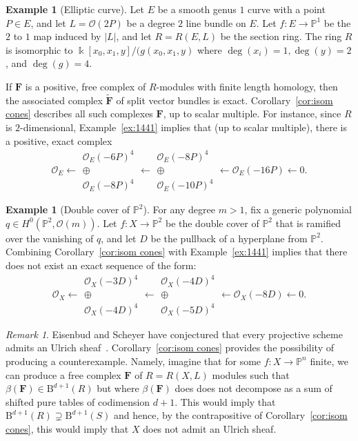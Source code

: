 \documentclass[12pt]{amsart}
\theoremstyle{definition}
\newtheorem{example}[lemma]{Example}
\theoremstyle{remark}
\newtheorem{remark}[lemma]{Remark}
\newcommand{\kk}{\Bbbk}
\newcommand{\PP}{\mathbb{P}}
\newcommand{\cO}{\mathcal{O}}
\newcommand{\FF}{\mathbf{F}}
\newcommand{\BBQ}{\mathrm{B}}
\begin{document}
\begin{example}[Elliptic curve]
Let $E$ be a smooth genus $1$ curve with a point $P\in E$, and let $L=\cO(2P)$ be a degree $2$ line bundle on $E$.  Let $f\colon E\to \PP^1$ be the $2$ to $1$ map induced by $|L|$, and let $R=R(E,L)$ be the section ring.  The ring $R$ is isomorphic to $\kk[x_0,x_1,y]/(g(x_0,x_1,y)$ where $\deg(x_i)=1,\deg(y)=2$, and $\deg(g)=4$.

If $\FF$ is a positive, free complex of $R$-modules with finite length homology, then the associated complex $\widetilde{\FF}$ of split vector bundles is exact.  Corollary~\ref{cor:isom cones} describes all such complexes $\FF$, up to scalar multiple.
For instance, since $R$ is $2$-dimensional, Example~\ref{ex:1441} implies that (up to scalar multiple), there is a positive, exact complex
\[
\cO_E\longleftarrow \begin{matrix}  \cO_E(-6P)^4\\ \oplus\\ \cO_E(-8P)^4\end{matrix}\longleftarrow \begin{matrix}  \cO_E(-8P)^4\\ \oplus\\ \cO_E(-10P)^4\end{matrix} \longleftarrow \cO_E(-16P)\longleftarrow 0.
\]
\end{example}



\begin{example}[Double cover of $\PP^2$]
For any degree $m>1$, fix a generic polynomial $q\in H^0(\PP^2, \cO(m))$.  Let $f\colon X\to\PP^2$ be the double cover of $\PP^2$ that is ramified over the vanishing of $q$, and let $D$ be the pullback of a hyperplane from $\PP^2$.  Combining Corollary~\ref{cor:isom cones} with Example~\ref{ex:1441} implies that there does not exist an exact sequence of the form:
\[
\cO_X\longleftarrow \begin{matrix}  \cO_X(-3D)^4\\ \oplus\\ \cO_X(-4D)^4\end{matrix}\longleftarrow \begin{matrix}  \cO_X(-4D)^4\\ \oplus\\ \cO_X(-5D)^4\end{matrix} \longleftarrow \cO_X(-8D)\longleftarrow 0.
\]
\end{example}


\begin{remark}
Eisenbud and Scheyer have conjectured that every projective scheme admits an Ulrich sheaf~\cite[p. 543]{eis-schrey-chow}.  Corollary~\ref{cor:isom cones} provides the possibility of producing a counterexample.  Namely, imagine that for some $f: X\to \PP^n$ finite, we can produce a free complex $\FF$ of $R=R(X,L)$ modules such that $\beta(\FF)\in \BBQ^{d+1}(R)$ but where $\beta(\FF)$ does does not decompose as a sum of shifted pure tables of codimension $d+1$.  This would imply that $\BBQ^{d+1}(R)\supsetneq \BBQ^{d+1}(S)$ and hence, by the contrapositive of Corollary~\ref{cor:isom cones}, this would imply that $X$ does not admit an Ulrich sheaf.
\end{remark}
\end{document}
